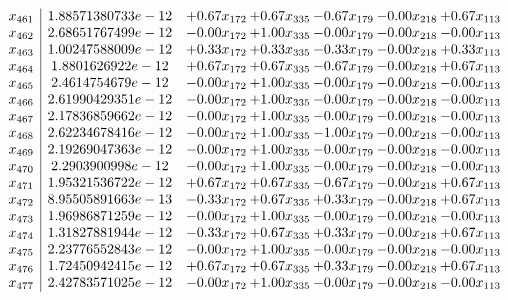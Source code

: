 \documentclass[8pt]{article}
\begin{document}
\[\begin{array}{c| c c@{\hskip 2pt} c@{\hskip 2pt} c@{\hskip 2pt} c@{\hskip 2pt} c@{\hskip 2pt} }
 x_{461}   &  1.88571380733e-12 & +  0.67 x_{172} & +  0.67 x_{335} & -0.67 x_{179} & -0.00 x_{218} & +  0.67 x_{113}\\
 x_{462}   &  2.68651767499e-12 & -0.00 x_{172} & +  1.00 x_{335} & -0.00 x_{179} & -0.00 x_{218} & -0.00 x_{113}\\
 x_{463}   &  1.00247588009e-12 & +  0.33 x_{172} & +  0.33 x_{335} & -0.33 x_{179} & -0.00 x_{218} & +  0.33 x_{113}\\
 x_{464}   &  1.8801626922e-12 & +  0.67 x_{172} & +  0.67 x_{335} & -0.67 x_{179} & -0.00 x_{218} & +  0.67 x_{113}\\
 x_{465}   &  2.4614754679e-12 & -0.00 x_{172} & +  1.00 x_{335} & -0.00 x_{179} & -0.00 x_{218} & -0.00 x_{113}\\
 x_{466}   &  2.61990429351e-12 & -0.00 x_{172} & +  1.00 x_{335} & -0.00 x_{179} & -0.00 x_{218} & -0.00 x_{113}\\
 x_{467}   &  2.17836859662e-12 & -0.00 x_{172} & +  1.00 x_{335} & -0.00 x_{179} & -0.00 x_{218} & -0.00 x_{113}\\
 x_{468}   &  2.62234678416e-12 & -0.00 x_{172} & +  1.00 x_{335} & -1.00 x_{179} & -0.00 x_{218} & -0.00 x_{113}\\
 x_{469}   &  2.19269047363e-12 & -0.00 x_{172} & +  1.00 x_{335} & -0.00 x_{179} & -0.00 x_{218} & -0.00 x_{113}\\
 x_{470}   &  2.2903900998e-12 & -0.00 x_{172} & +  1.00 x_{335} & -0.00 x_{179} & -0.00 x_{218} & -0.00 x_{113}\\
 x_{471}   &  1.95321536722e-12 & +  0.67 x_{172} & +  0.67 x_{335} & -0.67 x_{179} & -0.00 x_{218} & +  0.67 x_{113}\\
 x_{472}   &  8.95505891663e-13 & -0.33 x_{172} & +  0.67 x_{335} & +  0.33 x_{179} & -0.00 x_{218} & +  0.67 x_{113}\\
 x_{473}   &  1.96986871259e-12 & -0.00 x_{172} & +  1.00 x_{335} & -0.00 x_{179} & -0.00 x_{218} & -0.00 x_{113}\\
 x_{474}   &  1.31827881944e-12 & -0.33 x_{172} & +  0.67 x_{335} & +  0.33 x_{179} & -0.00 x_{218} & +  0.67 x_{113}\\
 x_{475}   &  2.23776552843e-12 & -0.00 x_{172} & +  1.00 x_{335} & -0.00 x_{179} & -0.00 x_{218} & -0.00 x_{113}\\
 x_{476}   &  1.72450942415e-12 & +  0.67 x_{172} & +  0.67 x_{335} & +  0.33 x_{179} & -0.00 x_{218} & +  0.67 x_{113}\\
 x_{477}   &  2.42783571025e-12 & -0.00 x_{172} & +  1.00 x_{335} & -0.00 x_{179} & -0.00 x_{218} & -0.00 x_{113}\\

\end{array}\]
\end{document}
